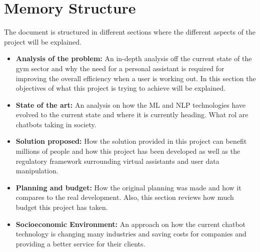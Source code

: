 \section{Memory Structure}\label{sec:chap1_mem-str}
The document is structured in different sections where the different aspects of the project will be explained.
\begin{itemize}
	\item{\textbf{Analysis of the problem:} An in-depth analysis off the current state of the gym sector and why the need for a personal assistant is required for improving the overall efficiency when a user is working out. In this section the objectives of what this project is trying to achieve will be explained.}
	\item{\textbf{State of the art:} An analysis on how the ML and NLP technologies have evolved to the current state and where it is currently heading. What rol are chatbots taking in society.}
	\item{\textbf{Solution proposed:} How the solution provided in this project can benefit millions of people and how this project has been developed as well as the regulatory framework surrounding virtual assistants and user data manipulation.}
	\item{\textbf{Planning and budget:} How the original planning was made and how it compares to the real development. Also, this section reviews how much budget this project has taken.}
	\item{\textbf{Socioeconomic Environment:} An approach on how the current chatbot technology is changing many industries and saving costs for companies and providing a better service for their clients.}
\end{itemize}

















